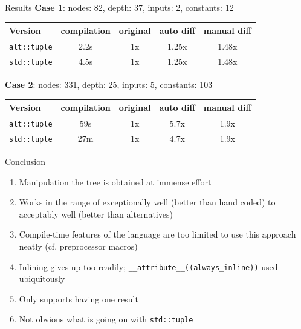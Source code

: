 \documentclass[xcolor=dvipsnames]{beamer}
\begin{document}
\begin{frame}[fragile]{Results}
\textbf{Case 1}: nodes: 82, depth: 37, inputs: 2, constants: 12
\begin{table}
\begin{tabular}{l | c | c | c | c }
Version & compilation & original & auto diff & manual diff \\
\hline \hline
\texttt{alt::tuple} & 2.2s & 1x & 1.25x & 1.48x \\
\texttt{std::tuple} & 4.5s & 1x & 1.25x & 1.48x \\
\end{tabular}
\end{table}
\vspace{10mm}
\textbf{Case 2}: nodes: 331, depth: 25, inputs: 5, constants: 103
\begin{table}
\begin{tabular}{l | c | c | c | c }
Version & compilation & original & auto diff & manual diff \\
\hline \hline
\texttt{alt::tuple} & 59s & 1x & 5.7x & 1.9x \\
\texttt{std::tuple} & 27m & 1x & 4.7x & 1.9x \\
\end{tabular}
\end{table}
\end{frame}


\begin{frame}[fragile]{Conclusion}
  \begin{enumerate}
  \item Manipulation the tree is obtained at immense effort \vspace{3mm}
  \item Works in the range of exceptionally well (better than hand coded) to acceptably well (better than alternatives) \vspace{5mm}
  \item Compile-time features of the language are too limited to use this approach neatly (cf. preprocessor macros) \vspace{3mm}
  \item Inlining gives up too readily; \verb$__attribute__((always_inline))$ used ubiquitously \vspace{3mm}
  \item Only supports having one result \vspace{3mm}
  \item Not obvious what is going on with \verb$std::tuple$ \vspace{3mm}
  \end{enumerate}
\end{frame}
\end{document}
